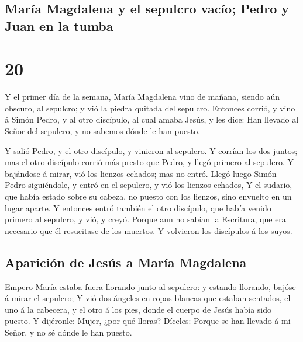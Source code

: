 \hypertarget{maruxeda-magdalena-y-el-sepulcro-vacuxedo-pedro-y-juan-en-la-tumba}{%
\subsection{María Magdalena y el sepulcro vacío; Pedro y Juan en la
tumba}\label{maruxeda-magdalena-y-el-sepulcro-vacuxedo-pedro-y-juan-en-la-tumba}}

\hypertarget{section-43-20}{%
\section{20}\label{section-43-20}}

 Y el primer día de la semana, María Magdalena vino de
mañana, siendo aún obscuro, al sepulcro; y vió la piedra quitada del
sepulcro.  Entonces corrió, y vino á Simón Pedro, y al
otro discípulo, al cual amaba Jesús, y les dice: Han llevado al Señor
del sepulcro, y no sabemos dónde le han puesto.

 Y salió Pedro, y el otro discípulo, y vinieron al
sepulcro.  Y corrían los dos juntos; mas el otro discípulo
corrió más presto que Pedro, y llegó primero al sepulcro. 
Y bajándose á mirar, vió los lienzos echados; mas no entró.
 Llegó luego Simón Pedro siguiéndole, y entró en el
sepulcro, y vió los lienzos echados,  Y el sudario, que
había estado sobre su cabeza, no puesto con los lienzos, sino envuelto
en un lugar aparte.  Y entonces entró también el otro
discípulo, que había venido primero al sepulcro, y vió, y creyó.
 Porque aun no sabían la Escritura, que era necesario que
él resucitase de los muertos.  Y volvieron los discípulos
á los suyos.

\hypertarget{apariciuxf3n-de-jesuxfas-a-maruxeda-magdalena}{%
\subsection{Aparición de Jesús a María
Magdalena}\label{apariciuxf3n-de-jesuxfas-a-maruxeda-magdalena}}

 Empero María estaba fuera llorando junto al sepulcro: y
estando llorando, bajóse á mirar el sepulcro;  Y vió dos
ángeles en ropas blancas que estaban sentados, el uno á la cabecera, y
el otro á los pies, donde el cuerpo de Jesús había sido puesto.
 Y dijéronle: Mujer, ¿por qué lloras? Díceles: Porque se
han llevado á mi Señor, y no sé dónde le han puesto.

